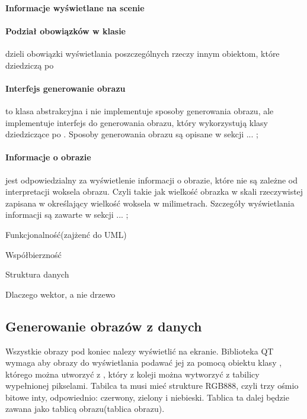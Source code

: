 \paragraph{Informacje wyświetlane na scenie}


\paragraph{Podział obowiązków w klasie}
 dzieli obowiązki wyświetlania poszczególnych rzeczy innym obiektom, które dziedziczą po \sokarclass

\paragraph{Interfejs generowanie obrazu}
 to klasa abstrakcyjna i nie implementuje sposoby generowania obrazu, ale implementuje interfejs do generowania obrazu, który wykorzystują klasy dziedziczące po .
Sposoby generowania obrazu są opisane w sekcji ... ;

\paragraph{Informacje o obrazie}
 jest odpowiedzialny za wyświetlenie informacji o obrazie, które nie są zależne od interpretacji woksela obrazu.
Czyli takie jak wielkość obrazka w skali rzeczywistej zapisana w  określający wielkość woksela w milimetrach.
Szczegóły wyświetlania informacji są zawarte w sekcji ... ;

Funkcjonalność(zajżenć do UML)

Współbierzność

Struktura danych

Dlaczego wektor, a nie drzewo

\subsection{Generowanie obrazów z danych}

Wszystkie obrazy pod koniec nalezy wyświetlić na ekranie. 
Biblioteka QT wymaga aby obrazy do wyświetlania podawać jej za pomocą obiektu klasy , którego można utworzyć z , który z koleji można wytworzyć z tabilicy wypełnionej pikselami.
Tabilca ta musi mieć strukture RGB888, czyli trzy ośmio bitowe inty, odpowiednio: czerwony, zielony i niebieski.
Tablica ta dalej będzie zawana jako tablicą obrazu(tablica obrazu).

